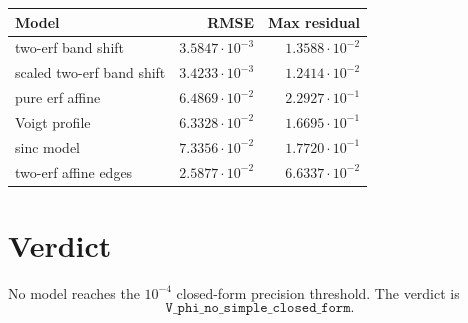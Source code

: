\documentclass[11pt]{article}
\begin{document}
\begin{center}
\begin{tabular}{lrr}
\toprule
Model & RMSE & Max residual\\
\midrule
two-erf band shift & \(3.5847\cdot 10^{-3}\) & \(1.3588\cdot 10^{-2}\)\\
scaled two-erf band shift & \(3.4233\cdot 10^{-3}\) & \(1.2414\cdot 10^{-2}\)\\
pure erf affine & \(6.4869\cdot 10^{-2}\) & \(2.2927\cdot 10^{-1}\)\\
Voigt profile & \(6.3328\cdot 10^{-2}\) & \(1.6695\cdot 10^{-1}\)\\
sinc model & \(7.3356\cdot 10^{-2}\) & \(1.7720\cdot 10^{-1}\)\\
two-erf affine edges & \(2.5877\cdot 10^{-2}\) & \(6.6337\cdot 10^{-2}\)\\
\bottomrule
\end{tabular}
\end{center}

\section{Verdict}

No model reaches the \(10^{-4}\) closed-form precision threshold. The verdict is
\[
\texttt{V\_phi\_no\_simple\_closed\_form}.
\]
\end{document}
